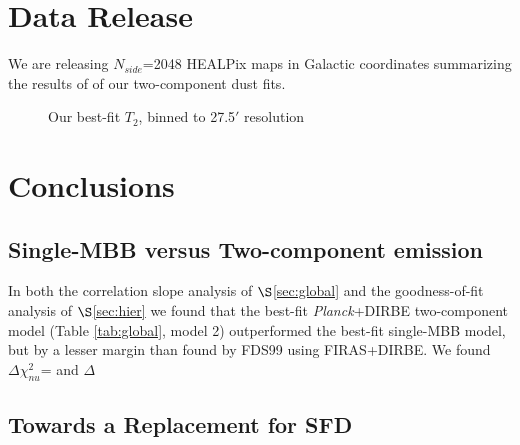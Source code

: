 \documentclass{emulateapj}
\newcommand{\PLANCK}{{\it Planck}}
\begin{document}
\section{Data Release}
\label{sec:release}
We are releasing $N_{side}$=2048 HEALPix maps in Galactic coordinates 
summarizing the results of of our two-component dust fits.




\begin{figure*} [ht]
\begin{center}
\caption{\label{fig:results} Our best-fit $T_2$, binned to 27.5$'$ resolution}
\end{center}
\end{figure*}

\section{Conclusions}
\label{sec:conclusion}

\subsection{Single-MBB versus Two-component emission}
In both the correlation slope analysis of $\S$\ref{sec:global} and the 
goodness-of-fit analysis of $\S$\ref{sec:hier} we found that the 
best-fit \PLANCK+DIRBE two-component model (Table \ref{tab:global}, model 2) 
outperformed the best-fit single-MBB model, but by a lesser margin than found 
by FDS99 using FIRAS+DIRBE. We found $\Delta \chi^2_{nu}$= and $\Delta$


\subsection{Towards a Replacement for SFD}
\label{sec:replace}
\end{document}
